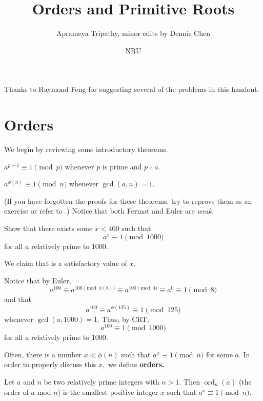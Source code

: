 \documentclass{article}
\title{Orders and Primitive Roots}
\author{Aprameya Tripathy, minor edits by Dennis Chen}
\date{NRU}
\begin{document}
\maketitle

Thanks to Raymond Feng for suggesting several of the problems in this handout.

\section{Orders}
We begin by reviewing some introductory theorems.

\begin{theo}[Fermat]
$a^{p-1} \equiv 1 \pmod{p}$ whenever $p$ is prime and $p \nmid a.$
\end{theo}

\begin{theo}[Euler]
$a^{\phi(n)} \equiv 1 \pmod{n}$ whenever $\gcd(a, n) = 1.$
\end{theo}

(If you have forgotten the proofs for these theorems, try to reprove them as an exercise or refer to .) Notice that both Fermat and Euler are \emph{weak.}

\begin{exam}
Show that there exists some $x < 400$ such that $$a^x \equiv 1 \pmod{1000}$$ for all $a$ relatively prime to $1000.$
\end{exam}

\begin{sol}
We claim that  is a satisfactory value of $x.$

Notice that by Euler, $$a^{100} \equiv a^{100 \pmod{\phi(8)}} \equiv a^{100 \pmod{4}} \equiv a^0 \equiv 1 \pmod{8}$$ and that $$a^{100} \equiv a^{\phi (125)} \equiv 1 \pmod{125}$$ whenever $\gcd(a, 1000) = 1.$ Thus, by CRT, $$a^{100} \equiv 1 \pmod{1000}$$ for all $a$ relatively prime to $1000.$
\end{sol}

Often, there is a number $x < \phi(n)$ such that $a^x \equiv 1 \pmod{n}$ for some $a.$ In order to properly discuss this $x,$ we define \textbf{orders.}

\begin{defi}[Orders]
Let $a$ and $n$ be two relatively prime integers with $n>1.$ Then $\operatorname{ord}_n(a)$ (the order of $a$ mod $n$) is the smallest positive integer $x$ such that $a^x \equiv 1 \pmod{n}.$
\end{defi}
\end{document}
